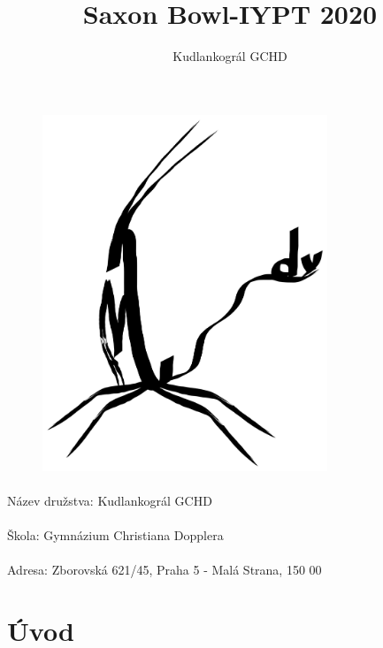 \documentclass[14pt,a4paper]{article}
\title{Saxon Bowl-IYPT 2020}
\author{Kudlankográl GCHD}
\date{}
\makeatletter
\newcommand{\settitle}{\@maketitle}
\makeatother
\begin{document}
\settitle
\thispagestyle{empty}
\addtocounter{page}{-1}


\begin{figure}[H]
\centering
    \includegraphics[width=0.76\textwidth]{kudlankogral.png}
\end{figure}

\paragraph{}
Název družstva: Kudlankográl GCHD
\paragraph{}
Škola: Gymnázium Christiana Dopplera
\paragraph{}
Adresa: Zborovská 621/45, Praha 5 - Malá Strana, 150 00

\clearpage
\newpage
\author{}
\maketitle
\thispagestyle{empty}
\tableofcontents
\newpage
\section{Úvod}
\label{sekce uvod}
\end{document}
